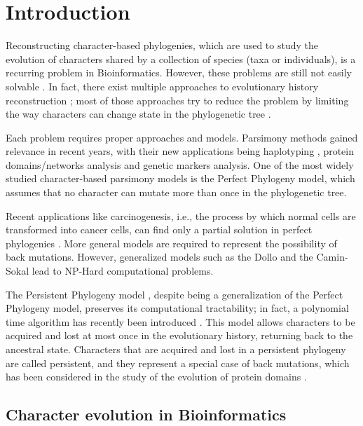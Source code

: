 
\section{Introduction}\label{section:introduction}

Reconstructing character-based phylogenies, which are used to study the evolution of characters shared by a collection of species (taxa or individuals), is a recurring problem in Bioinformatics.
However, these problems are still not easily solvable \cite{DPQ2011}.
In fact, there exist multiple approaches to evolutionary history reconstruction \cite{SD2003, MPL2004, BI2001}; most of those approaches try to reduce the problem by limiting the way characters can change state in the phylogenetic tree \cite{CS1990, PPptime1994}.

Each problem requires proper approaches and models.
Parsimony methods gained relevance in recent years, with their new applications being haplotyping \cite{PPHltime2005, PPHltime2007}, protein domains/networks analysis and genetic markers analysis.
One of the most widely studied character-based parsimony models is the Perfect Phylogeny model, which assumes that no character can mutate more than once in the phylogenetic tree.

Recent applications like carcinogenesis, i.e., the process by which normal cells are transformed into cancer cells, can find only a partial solution in perfect phylogenies \cite{PPE2014}.
More general models are required to represent the possibility of back mutations.
However, generalized models such as the Dollo and the Camin-Sokal lead to NP-Hard computational problems.

The Persistent Phylogeny model \cite{PPPbin2012}, despite being a generalization of the Perfect Phylogeny model, preserves its computational tractability; in fact, a polynomial time algorithm has recently been introduced \cite{PPPptime2016}.
This model allows characters to be acquired and lost at most once in the evolutionary history, returning back to the ancestral state.
Characters that are acquired and lost in a persistent phylogeny are called persistent, and they represent a special case of back mutations, which has been considered in the study of the evolution of protein domains \cite{CPPP2014}.

\subsection{Character evolution in Bioinformatics}\label{section:character-evolution}

